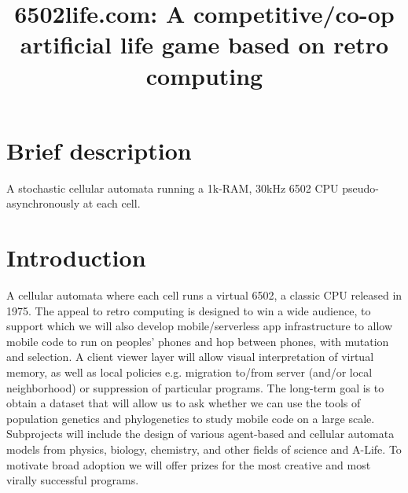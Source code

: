 \documentclass{article}
\begin{document}
\newcommand\Mb{\mathrm{Mb}}

\title{6502life.com: A competitive/co-op artificial life game based on retro computing}

\section{Brief description}
A stochastic cellular automata running a 1k-RAM, 30kHz 6502 CPU pseudo-asynchronously at each cell.


\section{Introduction}
A cellular automata where each cell runs a virtual 6502, a classic CPU released in 1975.
  The appeal to retro computing is designed to win a wide audience, to support which we will also develop mobile/serverless app
  infrastructure to allow mobile code to run on peoples' phones and hop between phones, with mutation and selection.
  A client viewer layer will allow visual interpretation of virtual memory, as well as local policies
  e.g. migration to/from server (and/or local neighborhood) or suppression of particular programs.
  The long-term goal is to obtain a dataset that will allow us to ask whether we can use
  the tools of population genetics and phylogenetics to study mobile code on a large scale.
  Subprojects will include the design of various agent-based and cellular automata models from physics, biology, chemistry,
  and other fields of science and A-Life.
  To motivate broad adoption we will offer prizes for the most creative and most virally successful programs.
\end{document}
